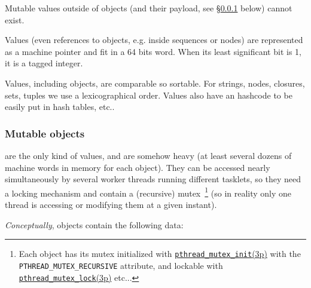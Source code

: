 Mutable values outside of objects (and their payload, see
\S\ref{subsubsec:objects} below) cannot exist.

Values (even references to objects, e.g. inside sequences or nodes)
are represented as a machine pointer and fit in a 64 bits word. When
its least significant bit is 1, it is a tagged integer.

Values, including objects, are comparable so sortable. For strings,
nodes, closures, sets, tuples we use a lexicographical order. Values
also have an hashcode to be easily put in hash tables, etc..

\subsubsection{Mutable objects}
\label{subsubsec:objects}

 are the only kind of 
values, and are somehow heavy (at least several dozens of machine words
in memory for each object). They can be accessed nearly simultaneously
by several worker threads running different tasklets, so they need a
locking mechanism and contain a (recursive) mutex~\footnote{Each
  object has its mutex initialized with
  \href{http://man7.org/linux/man-pages/man3/pthread\_mutex\_init.3p.html}{\texttt{pthread\_mutex\_init}(3p)}
  with the \texttt{PTHREAD\_MUTEX\_RECURSIVE} attribute, and lockable
  with
  \href{http://man7.org/linux/man-pages/man3/pthread\_mutex\_lock.3p.html}{\texttt{pthread\_mutex\_lock}(3p)}
  etc...} (so in reality only one thread is accessing or modifying
them at a given instant).

\medskip

\emph{Conceptually}, objects contain the following data:

